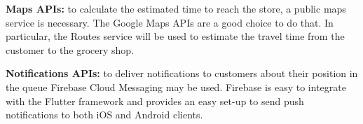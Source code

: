 \textbf{Maps APIs:}
to calculate the estimated time to reach the store, a public maps service is necessary. The Google Maps APIs are a good choice to do that. In particular, the Routes service will be used to estimate the travel time from the customer to the grocery shop.

\bigbreak
\textbf{Notifications APIs:}
to deliver notifications to customers about their position in the queue Firebase Cloud Messaging may be used. Firebase is easy to integrate with the Flutter framework and provides an easy set-up to send push notifications to both iOS and Android clients.